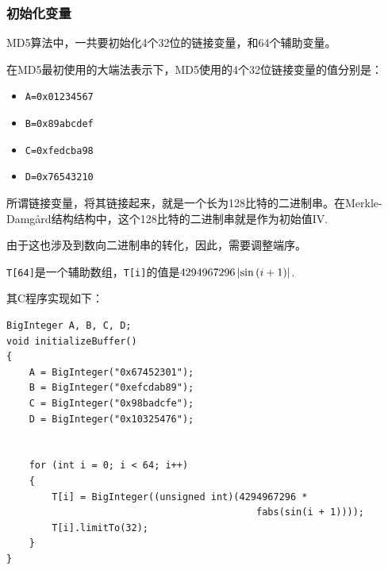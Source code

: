 \subsubsection{初始化变量}
MD5算法中，一共要初始化4个32位的链接变量，和64个辅助变量。\par
在MD5最初使用的大端法表示下，MD5使用的4个32位链接变量的值分别是：
\begin{itemize}
	\item \verb`A=0x01234567`
	\item \verb`B=0x89abcdef`
	\item \verb`C=0xfedcba98`
	\item \verb`D=0x76543210`
\end{itemize}

所谓链接变量，将其链接起来，就是一个长为128比特的二进制串。在Merkle-Damg\aa rd结构结构中，这个128比特的二进制串就是作为初始值$\mathrm{IV}$.\par
由于这也涉及到数向二进制串的转化，因此，需要调整端序。\par
\verb`T[64]`是一个辅助数组，\verb`T[i]`的值是$4294967296\left| \sin\left( {i+1}\right) \right|$.\par
其C程序实现如下：
\begin{prove}
\begin{verbatim}
BigInteger A, B, C, D;
void initializeBuffer()
{
    A = BigInteger("0x67452301");
    B = BigInteger("0xefcdab89");
    C = BigInteger("0x98badcfe");
    D = BigInteger("0x10325476");


    for (int i = 0; i < 64; i++)
    {
        T[i] = BigInteger((unsigned int)(4294967296 * 
                                            fabs(sin(i + 1))));
        T[i].limitTo(32);
    }
}
\end{verbatim}
\end{prove}
